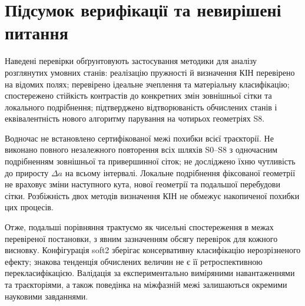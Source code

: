 \section{Підсумок верифікації та невирішені питання}
\label{sec:ver-summary}

Наведені перевірки обґрунтовують застосування методики для аналізу розглянутих умовних станів: реалізацію пружності й визначення КІН перевірено на відомих полях; перевірено ідеальне зчеплення та матеріальну класифікацію; спостережено стійкість контрастів до конкретних змін зовнішньої сітки та локального подрібнення; підтверджено відтворюваність обчислених станів і еквівалентність нового алгоритму парування на чотирьох геометріях S8.

Водночас не встановлено сертифікованої межі похибки всієї траєкторії. Не виконано повного незалежного повторення всіх шляхів S0--S8 з одночасним подрібненням зовнішньої та привершинної сіток; не досліджено їхню чутливість до приросту $\Delta a$ на всьому інтервалі. Локальне подрібнення фіксованої геометрії не враховує зміни наступного кута, нової геометрії та подальшої перебудови сітки. Розбіжність двох методів визначення КІН не обмежує накопиченої похибки цих процесів.

Отже, подальші порівняння трактуємо як чисельні спостереження в межах перевіреної постановки, з явним зазначенням обсягу перевірок для кожного висновку. Конфігурація soft2 зберігає консервативну класифікацію нерозрізненого ефекту; знакова тенденція обчислених величин не є її ретроспективною перекласифікацією. Валідація за експериментально виміряними навантаженнями та траєкторіями, а також поведінка на міжфазній межі залишаються окремими науковими завданнями.
